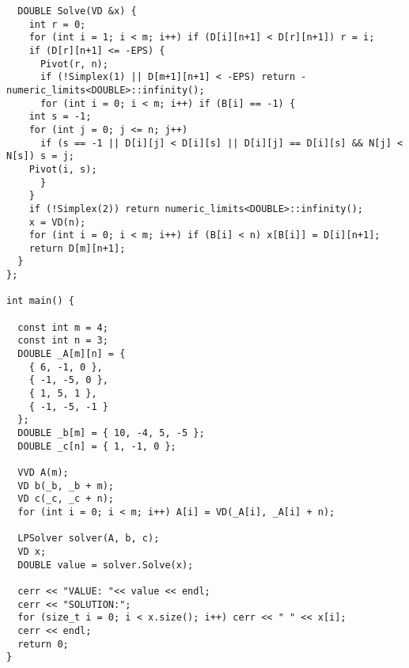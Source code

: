 \begin{lstlisting}
  DOUBLE Solve(VD &x) {
    int r = 0;
    for (int i = 1; i < m; i++) if (D[i][n+1] < D[r][n+1]) r = i;
    if (D[r][n+1] <= -EPS) {
      Pivot(r, n);
      if (!Simplex(1) || D[m+1][n+1] < -EPS) return -numeric_limits<DOUBLE>::infinity();
      for (int i = 0; i < m; i++) if (B[i] == -1) {
	int s = -1;
	for (int j = 0; j <= n; j++) 
	  if (s == -1 || D[i][j] < D[i][s] || D[i][j] == D[i][s] && N[j] < N[s]) s = j;
	Pivot(i, s);
      }
    }
    if (!Simplex(2)) return numeric_limits<DOUBLE>::infinity();
    x = VD(n);
    for (int i = 0; i < m; i++) if (B[i] < n) x[B[i]] = D[i][n+1];
    return D[m][n+1];
  }
};

int main() {

  const int m = 4;
  const int n = 3;  
  DOUBLE _A[m][n] = {
    { 6, -1, 0 },
    { -1, -5, 0 },
    { 1, 5, 1 },
    { -1, -5, -1 }
  };
  DOUBLE _b[m] = { 10, -4, 5, -5 };
  DOUBLE _c[n] = { 1, -1, 0 };
  
  VVD A(m);
  VD b(_b, _b + m);
  VD c(_c, _c + n);
  for (int i = 0; i < m; i++) A[i] = VD(_A[i], _A[i] + n);

  LPSolver solver(A, b, c);
  VD x;
  DOUBLE value = solver.Solve(x);
  
  cerr << "VALUE: "<< value << endl;
  cerr << "SOLUTION:";
  for (size_t i = 0; i < x.size(); i++) cerr << " " << x[i];
  cerr << endl;
  return 0;
}


\end{lstlisting}